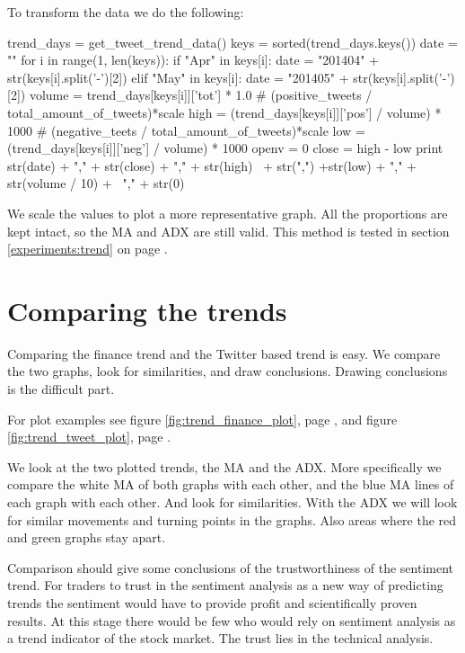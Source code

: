 To transform the data we do the following: 
\begin{python}
trend_days = get_tweet_trend_data()
keys = sorted(trend_days.keys())
date = ""
for i in range(1, len(keys)):
    if "Apr" in keys[i]:
        date = "201404" + str(keys[i].split('-')[2])
    elif "May" in keys[i]:
        date = "201405" + str(keys[i].split('-')[2])
    volume = trend_days[keys[i]]['tot'] * 1.0
    # (positive_tweets / total_amount_of_tweets)*scale
    high = (trend_days[keys[i]]['pos'] / volume) * 1000
    # (negative_teets / total_amount_of_tweets)*scale
    low = (trend_days[keys[i]]['neg'] / volume) * 1000
    openv = 0
    close = high - low
    print str(date) + "," + str(close) + "," + str(high) \
          + str(",") +str(low) + "," + str(volume / 10) + \
          "," + str(0)
\end{python}

We scale the values to plot a more representative graph. All the
proportions are kept intact, so the MA and ADX are still valid.
This method is tested in section \ref{experiments:trend} on page
\pageref{experiments:trend}.
% 

\section{Comparing the trends}\label{trend:compared}
Comparing the finance trend and the Twitter based trend is easy. We compare the
two graphs, look for similarities, and draw conclusions. Drawing conclusions is
the difficult part.

For plot examples see figure \ref{fig:trend_finance_plot}, page
\pageref{fig:trend_finance_plot}, and figure \ref{fig:trend_tweet_plot}, page
\pageref{fig:trend_tweet_plot}.

We look at the two plotted trends, the MA and the ADX. More specifically we
compare the white MA of both graphs with each other, and the blue MA lines of
each graph with each other. And look for similarities. With the ADX we will look
for similar movements and turning points in the graphs. Also areas where the
red and green graphs stay apart.  

Comparison should give some conclusions of the trustworthiness of the
sentiment trend. For traders to trust in the sentiment analysis as a new way of
predicting trends the sentiment would have to provide profit and scientifically
proven results. At this stage there would be few who would rely on sentiment
analysis as a trend indicator of the stock market. The trust lies in the
technical analysis.  

